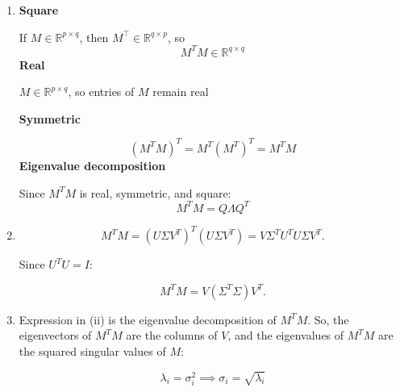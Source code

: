 \begin{answer}

\begin{enumerate}
    \item
    \textbf{Square}
    
    If $M \in \mathbb{R}^{p \times q}$, then $M^{\top} \in \mathbb{R}^{q \times p}$, so
    $$M^T M \in \mathbb{R}^{q \times q}$$
    \textbf{Real}

    $M \in \mathbb{R}^{p \times q}$, so entries of $M$ remain real

    \textbf{Symmetric}
    
    $$(M^T M)^T = M^T (M^T)^T = M^T M$$
    \textbf{Eigenvalue decomposition}
    
    Since $M^TM$ is real, symmetric, and square:
    $$M^T M = Q \Lambda Q^T$$

    \item

    \[
    M^T M = (U \Sigma V^T)^T (U \Sigma V^T)
    = V \Sigma^T U^T U \Sigma V^T.
    \]

    Since \(U^T U = I\):

    \[
    \boxed{M^T M = V (\Sigma^T \Sigma) V^T}.
    \]
    \item

    Expression in (ii) is the eigenvalue decomposition of \(M^T M\). So, the eigenvectors of \(M^T M\) are the columns of \(V\), and the eigenvalues of \(M^T M\) are the squared singular values of \(M\):

    \[
    \lambda_i = \sigma_i^2 \implies \boxed{\sigma_i = \sqrt{\lambda_i}}
    \]

\end{enumerate}

\end{answer}